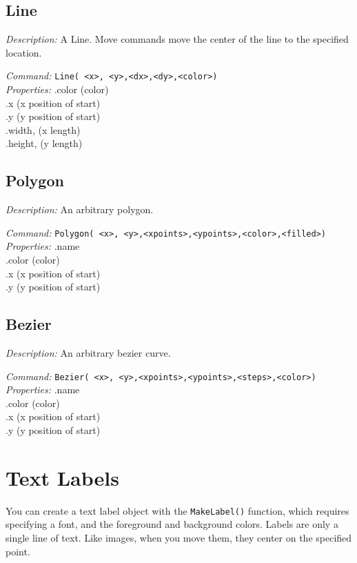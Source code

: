 \subsection{Line}
\emph{Description:} A Line. Move commands move the center
  of the line to the specified location.

\emph{Command:}  \verb+Line( <x>, <y>,<dx>,<dy>,<color>)+\\

\emph{Properties:}
.color (color) \\
.x  (x position of start) \\
.y  (y position of start)\\
.width, (x length)\\
.height,  (y length)\\




\subsection{Polygon}
\emph{Description:} An arbitrary polygon. 

\emph{Command:}  \verb+Polygon( <x>, <y>,<xpoints>,<ypoints>,<color>,<filled>)+\\

\emph{Properties:}
.name\\
.color (color) \\
.x  (x position of start) \\
.y  (y position of start)\\

\subsection{Bezier}
\emph{Description:} An arbitrary bezier curve.

\emph{Command:}  \verb+Bezier( <x>, <y>,<xpoints>,<ypoints>,<steps>,<color>)+\\

\emph{Properties:}
.name\\
.color (color) \\
.x  (x position of start) \\
.y  (y position of start)\\


\section{Text Labels}

You can create a text label object with the \texttt{MakeLabel()} function, 
which requires specifying a font, and the foreground and background colors.  Labels are only a single line of text. Like images, when you move them,
they center on the specified point.

